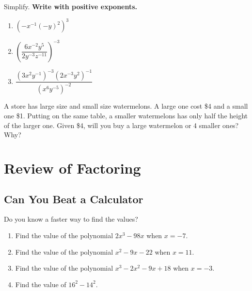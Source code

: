 \documentclass[
  en,11pt]{elegantbook}
\newcommand{\size}[2]{{\fontsize{#1}{0}\selectfont#2}}
\newenvironment{rmdthink}{
	\vspace*{0.5\baselineskip}
	\par\noindent
	\makebox[-4pt][r]{\color{green!90}\size{12}{\faLightbulbO}\,\,}
    \begin{tcolorbox}[
    enhanced,
    title={\textbf{\color{second}Think}},
    title style={left color=blue!10!green!20!white,right color=yellow!20!blue!20!white},
    colback=green!20!white,
    ]
    \sffamily
}{
    \end{tcolorbox}
	\par\ignorespacesafterend
}
\let\BeginKnitrBlock\begin \let\EndKnitrBlock\end
\begin{document}
\BeginKnitrBlock{exercise}
\protect\hypertarget{exr:unnamed-chunk-7}{}{\label{exr:unnamed-chunk-7} }
Simplify. \textbf{Write with positive exponents.}

\begin{enumerate}
\def\labelenumi{\arabic{enumi}.}

\item
  \(\left(-x^{-1}(-y)^2\right)^3\)
\item
  \(\left(\dfrac{6x^{-2}y^5}{2y^{-3}z^{-11}}\right)^{-3}\)
\item
  \(\dfrac{(3 x^{2} y^{-1})^{-3}(2 x^{-3} y^{2})^{-1}}{(x^{6} y^{-5})^{-2}}\)
\end{enumerate}
\EndKnitrBlock{exercise}

\BeginKnitrBlock{exercise}
\protect\hypertarget{exr:unnamed-chunk-8}{}{\label{exr:unnamed-chunk-8} }
A store has large size and small size watermelons. A large one cost \$4 and a small one \$1. Putting on the same table, a smaller watermelons has only half the height of the larger one. Given \$4, will you buy a large watermelon or 4 smaller ones? Why?
\EndKnitrBlock{exercise}

\hypertarget{review-of-factoring}{%
\chapter{Review of Factoring}\label{review-of-factoring}}

\hypertarget{can-you-beat-a-calculator}{%
\section{Can You Beat a Calculator}\label{can-you-beat-a-calculator}}

\begin{rmdthink}

Do you know a faster way to find the values?

\begin{enumerate}
\def\labelenumi{\arabic{enumi}.}

\item
  Find the value of the polynomial \(2x^3-98x\) when \(x=-7\).
\item
  Find the value of the polynomial \(x^2-9x-22\) when \(x=11\).
\item
  Find the value of the polynomial \(x^3-2x^2-9x+18\) when \(x=-3\).
\item
  Find the value of \(16^2-14^2\).
\end{enumerate}

\end{rmdthink}
\end{document}
